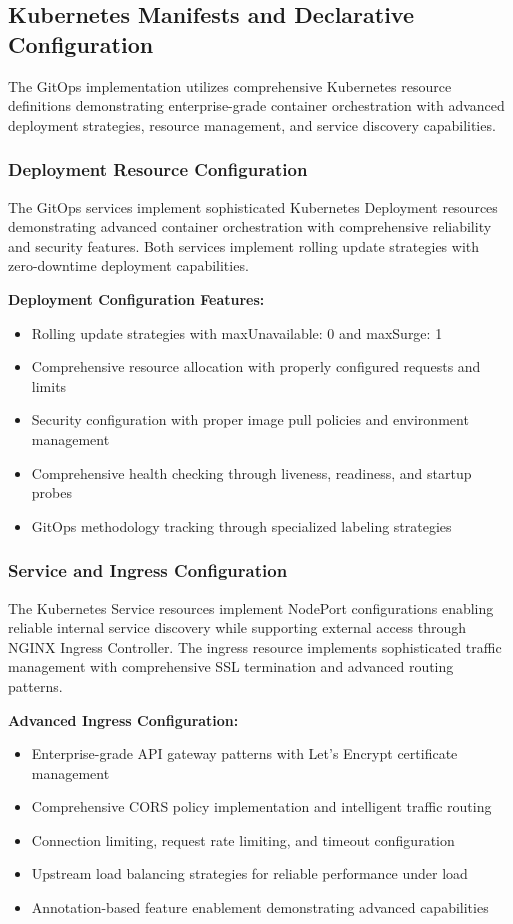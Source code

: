 \subsection{Kubernetes Manifests and Declarative Configuration}

The GitOps implementation utilizes comprehensive Kubernetes resource definitions demonstrating enterprise-grade container orchestration with advanced deployment strategies, resource management, and service discovery capabilities.

\subsubsection{Deployment Resource Configuration}

The GitOps services implement sophisticated Kubernetes Deployment resources demonstrating advanced container orchestration with comprehensive reliability and security features. Both services implement rolling update strategies with zero-downtime deployment capabilities.

\textbf{Deployment Configuration Features:}
\begin{itemize}
\item Rolling update strategies with maxUnavailable: 0 and maxSurge: 1
\item Comprehensive resource allocation with properly configured requests and limits
\item Security configuration with proper image pull policies and environment management
\item Comprehensive health checking through liveness, readiness, and startup probes
\item GitOps methodology tracking through specialized labeling strategies
\end{itemize}

\subsubsection{Service and Ingress Configuration}

The Kubernetes Service resources implement NodePort configurations enabling reliable internal service discovery while supporting external access through NGINX Ingress Controller. The ingress resource implements sophisticated traffic management with comprehensive SSL termination and advanced routing patterns.

\textbf{Advanced Ingress Configuration:}
\begin{itemize}
\item Enterprise-grade API gateway patterns with Let's Encrypt certificate management
\item Comprehensive CORS policy implementation and intelligent traffic routing
\item Connection limiting, request rate limiting, and timeout configuration
\item Upstream load balancing strategies for reliable performance under load
\item Annotation-based feature enablement demonstrating advanced capabilities
\end{itemize}

